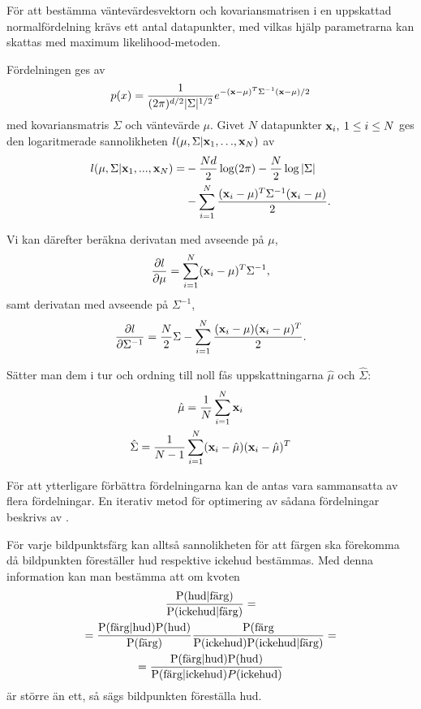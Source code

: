 \documentclass[../rapport_MVEX01-11-05]{subfiles}
\begin{document}
För att bestämma väntevärdesvektorn och kovariansmatrisen i en
uppskattad normalfördelning krävs ett
antal datapunkter, med vilkas hjälp parametrarna kan skattas med maximum
likelihood-metoden.

Fördelningen ges av
\begin{equation*}
  p(x)=\frac{1}{(2\pi)^{d/2}|\Sigma|^{1/2}}e^{-(\mathbf{x}-\mu)^T\Sigma^{-1}(\mathbf{x}-\mu)/2}
\end{equation*}
med kovariansmatris $\Sigma$ och väntevärde $\mu$.
Givet $N$ datapunkter $\mathbf{x}_i,\:1\leq i\leq N$ ges den logaritmerade
sannolikheten $l(\mu,\Sigma|\mathbf{x}_1,{\ldots} ,\mathbf{x}_N)$ av
\begin{equation*}
  \begin{aligned}
  l(\mu,\Sigma|\mathbf{x}_1,...,\mathbf{x}_N) = &-\frac{Nd}{2}\log(2\pi)-\frac{N}{2}\log|\Sigma|\\
                              &-\sum_{i=1}^N\frac{(\mathbf{x}_i-\mu)^T\Sigma^{-1}(\mathbf{x}_i-\mu)}{2}.
  \end{aligned}
\end{equation*}

Vi kan därefter beräkna derivatan med avseende på $\mu$,
\begin{equation*}
  \frac{\partial l}{\partial \mu}=\sum_{i=1}^N(\mathbf{x}_i-\mu)^T\Sigma^{-1},
\end{equation*}
samt derivatan med avseende på $\Sigma^{-1}$,
\begin{equation*}
  \frac{\partial l}{\partial \Sigma^{-1}}=\frac{N}{2}\Sigma
  -\sum_{i=1}^N\frac{(\mathbf{x}_i-\mu)(\mathbf{x}_i-\mu)^T}{2}.
\end{equation*}

Sätter man dem i tur och ordning till noll fås uppskattningarna
$\hat\mu$ och $\hat\Sigma$:
\begin{gather*}
  \hat\mu    =\frac{1}{N}\sum_{i=1}^N\mathbf{x}_i\\
  \hat\Sigma =\frac{1}{N-1}\sum_{i=1}^N(\mathbf{x}_i-\hat\mu)(\mathbf{x}_i-\hat\mu)^T
\end{gather*}

För att ytterligare förbättra fördelningarna kan de antas vara
sammansatta av flera fördelningar. En iterativ metod för optimering av
sådana fördelningar beskrivs av .

För varje bildpunktsfärg kan alltså sannolikheten för att färgen ska
förekomma då bildpunkten föreställer hud
respektive ickehud bestämmas. Med denna information kan man bestämma
att om kvoten 
\begin{multline*}
\frac{\mathrm{P}(\textrm{hud}|\textrm{färg})}{\mathrm{P}(\textrm{ickehud}|\textrm{färg})}=\\
=\frac{\mathrm{P}(\textrm{färg}|\textrm{hud})\mathrm{P}(\textrm{hud})}{\mathrm{P}(\textrm{färg})}
 \frac{\mathrm{P}(\textrm{färg}}{\mathrm{P}(\textrm{ickehud})\mathrm{P}(\textrm{ickehud}|\textrm{färg})}=\\
=\frac{\mathrm{P}(\textrm{färg}|\textrm{hud})\mathrm{P}(\textrm{hud})}{\mathrm{P}(\textrm{färg}|\textrm{ickehud})
 P(\textrm{ickehud})}
\end{multline*}
är större än ett, så sägs bildpunkten föreställa hud. 
\end{document}
